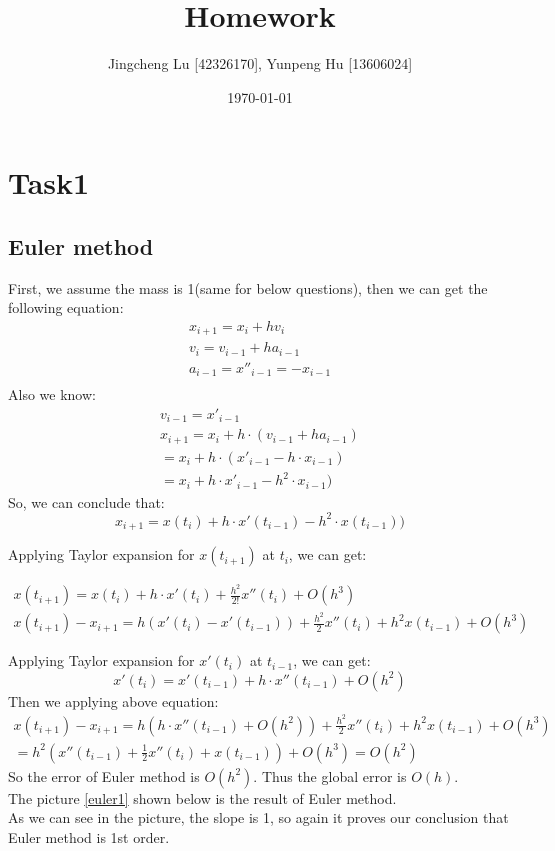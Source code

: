 \documentclass[12pt]{article}%
\begin{document}
\title{Homework}
\author{Jingcheng Lu [42326170], Yunpeng Hu [13606024]}
\date{\today}
\maketitle
\section{Task1}
\subsection{Euler method}
First, we assume the mass is 1(same for below questions), then we can get the following equation:
\[\begin{array}{l}
{x_{i + 1}} = {x_i} + h{v_i}\\
{v_i} = {v_{i - 1}} + h{a_{i - 1}}\\
{a_{i - 1}} = {{x''}_{i - 1}} =  - {x_{i - 1}}\\
\end{array}\]
Also we know:
\[\begin{array}{l}
{v_{i - 1}} = {{x'}_{i - 1}}\\
{x_{i + 1}} = {x_i} + h \cdot ({v_{i - 1}} + h{a_{i - 1}})\\
 = {x_i} + h \cdot ({{x'}_{i - 1}} - h \cdot {x_{i - 1}})\\
 = {x_i} + h \cdot {{x'}_{i - 1}} - {h^2} \cdot {x_{i - 1}})
\end{array}\]
So, we can conclude that:
\[{x_{i + 1}} = x({t_i}) + h \cdot x'({t_{i - 1}}) - {h^2} \cdot x({t_{i - 1}}))\]

Applying Taylor expansion for \(x({t_{i + 1}})\) at \({t_{i}}\), we can get:

\[\begin{array}{l}
x({t_{i + 1}}) = x({t_i}) + h \cdot x'({t_i}) + \frac{{{h^2}}}{{2!}}x''({t_i}) + O({h^3})\\
x({t_{i + 1}}) - {x_{i + 1}} = h(x'({t_i}) - x'({t_{i - 1}})) + \frac{{{h^2}}}{2}x''({t_i}) + {h^2}x({t_{i - 1}}) + O({h^3})
\end{array}\]

Applying Taylor expansion for \(x'({t_{i}})\) at \({t_{i-1}}\), we can get:
\[x'({t_i}) = x'({t_{i - 1}}) + h \cdot x''({t_{i - 1}}) + O({h^2})\]
Then we applying above equation:
\[\begin{array}{l}
x({t_{i + 1}}) - {x_{i + 1}} = h(h \cdot x''({t_{i - 1}}) + O({h^2})) + \frac{{{h^2}}}{2}x''({t_i}) + {h^2}x({t_{i - 1}}) + O({h^3})\\
 = {h^2}(x''({t_{i - 1}}) + \frac{1}{2}x''({t_i}) + x({t_{i - 1}})) + O({h^3}) = O({h^2})
\end{array}\]
So the error of Euler method is \(O({h^2})\). Thus the global error is \(O({h})\).
\\
The picture \ref{euler1} shown below is the result of Euler method.
\\
As we can see in the picture, the slope is 1, so again it proves our conclusion that Euler method is 1st order.
\end{document}
